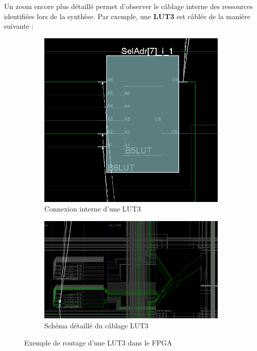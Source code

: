 Un zoom encore plus détaillé permet d’observer le câblage interne des ressources identifiées lors de la synthèse.  
Par exemple, une \textbf{LUT3} est câblée de la manière suivante :  

\begin{figure}[H]
    \centering
    \begin{subfigure}[b]{0.35\linewidth}
        \centering
        \includegraphics[width=\linewidth]{images/Routage/Rou_3.png}
        \caption{Connexion interne d’une LUT3}
        \label{fig:rout_lut3a}
    \end{subfigure}
    \hfill
    \begin{subfigure}[b]{0.55\linewidth}
        \centering
        \includegraphics[width=\linewidth]{images/Routage/Rou_4.png}
        \caption{Schéma détaillé du câblage LUT3}
        \label{fig:rout_lut3b}
    \end{subfigure}
    \caption{Exemple de routage d’une LUT3 dans le FPGA}
    \label{fig:rout_lut3}
\end{figure}

